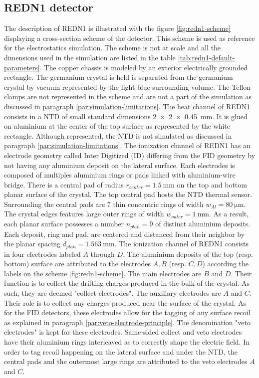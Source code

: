 \subsection{REDN1 detector}
\label{par:redn1-presentation}

The description of REDN1 is illustrated with the figure \ref{fig:redn1-scheme} displaying a cross-section scheme of the detector. This scheme is used as reference for the electrostatics simulation. The scheme is not at scale and all the dimensions used in the simulation are listed in the table \ref{tab:redn1-default-parameters}.
The copper chassis is modeled by an exterior electrically grounded rectangle. The germanium crystal is held is separated from the germanium crystal by vacuum represented by the light blue surrounding volume.
The Teflon clamps are not represented in the scheme and are not a part of the simulation as discussed in paragraph \ref{par:simulation-limitations}.
The heat channel of REDN1 consists in a NTD of small standard dimensions \SI{2 x 2 x 0.45}{\mm}. It is glued on aluminium at the center of the top surface as represented by the white rectangle. Although represented, the NTD is not simulated as discussed in paragraph \ref{par:simulation-limitations}.
The ionization channel of REDN1 has an electrode geometry called Inter Digitized (ID) differing from the FID geometry by not having any aluminium deposit on the lateral surface. Each electrodes is composed of multiples aluminium rings or pads linked with aluminium-wire bridge. There is a central pad of radius $r_{center}=\SI{1.5}{\mm}$ on the top and bottom planar surface of the crystal. The top central pad hosts the NTD thermal sensor. Surrounding the central pads are $7$ thin concentric rings of width $w_{Al} = \SI{80}{\micro\meter}$. The crystal edges features large outer rings of width $w_{outer}=\SI{1}{\mm}$. As a result, each planar surface possesses a number $n_{plan}=9$ of distinct aluminium deposits. Each deposit, ring and pad, are centered and distanced from their neighbor by the planar spacing $d_{plan} = \SI{1.563}{\mm}$.
The ionization channel of REDN1 consists in four electrodes labeled $A$ through $D$. The aluminium deposits of the top (resp. bottom) surface are attributed to the electrodes $A,B$ (resp. $C,D$) according the labels on the scheme \ref{fig:redn1-scheme}.
The main electrodes are $B$ and $D$. Their function is to collect the drifting charges produced in the bulk of the crystal. As such, they are deemed "collect electrodes".
The auxiliary electrodes are $A$ and $C$. Their role is to collect any charges produced near the surface of the crystal. As for the FID detectors, these electrodes allow for the tagging of any surface recoil as explained in paragraph \ref{par:veto-electrode-principle}. The denomination "veto electrodes" is kept for these electrodes.
Same-sided collect and veto electrodes have their aluminium rings interleaved as to correctly shape the electric field. In order to tag recoil happening on the lateral surface and under the NTD, the central pads and the outermost large rings are attributed to the veto electrodes $A$ and $C$. 

